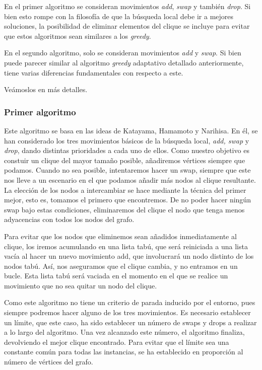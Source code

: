En el primer algoritmo se consideran movimientos \textit{add}, \textit{swap} y también \textit{drop}.
Si bien esto rompe con la filosofía de que la búsqueda local debe ir a mejores soluciones, la posibilidad de
eliminar elementos del clique se incluye para evitar que estos algoritmos sean similares a los
\textit{greedy}.

En el segundo algoritmo, solo se consideran movimientos \textit{add} y \textit{swap}. Si bien puede
parecer similar al algoritmo \textit{greedy} adaptativo detallado anteriormente, tiene varias diferencias
fundamentales con respecto a este.

Veámoslos en más detalles.

\subsubsection{Primer algoritmo}

Este algoritmo se basa en las ideas de Katayama, Hamamoto y Narihisa. En él, se han considerado
los tres movimientos básicos de la búsqueda local, \textit{add, swap} y \textit{drop},
dando distintas prioridades a cada uno de ellos. Como nuestro objetivo es constuir un clique del
mayor tamaño posible, añadiremos vértices siempre que podamos. Cuando no sea posible, intentaremos
hacer un swap, siempre que este nos lleve a un escenario en el que podamos añadir más nodos
al clique resultante. La elección de los nodos a intercambiar se hace mediante la técnica del
primer mejor, esto es, tomamos el primero que encontremos. De no poder hacer ningún swap bajo
estas condiciones, eliminaremos del clique el nodo que tenga menos adyacencias con todos los nodos del grafo.

Para evitar que los nodos que eliminemos sean añadidos inmediatamente al clique,
los iremos acumulando en una lista tabú, que será reiniciada a una lista vacía al hacer
un nuevo movimiento add, que involucrará un nodo distinto de los nodos tabú. Así, nos aseguramos
que el clique cambia, y no entramos en un bucle. Esta lista tabú será vaciada en el momento en el
que se realice un movimiento que no sea quitar un nodo del clique.

Como este algoritmo no tiene un criterio de parada inducido por el entorno, pues siempre podremos
hacer alguno de los tres movimientos. Es necesario establecer un límite, que este caso, ha
sido establecer un número de swaps y drops a realizar a lo largo del algoritmo. Una vez alcanzado
este número, el algoritmo finaliza, devolviendo el mejor clique encontrado.
Para evitar que el límite sea una constante común para todas las instancias, se ha establecido en proporción
al número de vértices del grafo.


